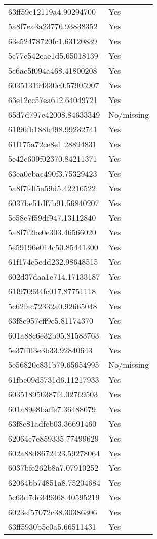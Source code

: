 \begin{tabular}{ll}
63ff59c12119a4.90294700 & Yes \\
5a8f7ea3a23776.93838352 & Yes \\
63e52478720fc1.63120839 & Yes \\
5c77c542eae1d5.65018139 & Yes \\
5c6ac5f094a468.41800208 & Yes \\
603513194330c0.57905907 & Yes \\
63e12cc57ea612.64049721 & Yes \\
65d7d797e42008.84633349 & No/missing \\
61f96fb188b498.99232741 & Yes \\
61f175a72ce8e1.28894831 & Yes \\
5e42c609f02370.84211371 & Yes \\
63ea0ebac490f3.75329423 & Yes \\
5a8f7fdf5a59d5.42216522 & Yes \\
6037be51df7b91.56840207 & Yes \\
5e58e7f59df947.13112840 & Yes \\
5a8f7f2be0e303.46566020 & Yes \\
5e59196e014c50.85441300 & Yes \\
61f174e5cdd232.98648515 & Yes \\
602d37daa1e714.17133187 & Yes \\
61f970934fc017.87751118 & Yes \\
5c62fac72332a0.92665048 & Yes \\
63f8c957cff9e5.81174370 & Yes \\
601a88c6e32b95.81583763 & Yes \\
5e37ffff3e3b33.92840643 & Yes \\
5e56820c831b79.65654995 & No/missing \\
61fbe09d5731d6.11217933 & Yes \\
603518950387f4.02769503 & Yes \\
601a89e8baffe7.36488679 & Yes \\
63f8c81adfcb03.36691460 & Yes \\
62064c7e859335.77499629 & Yes \\
602a88d8672423.59278064 & Yes \\
6037bfe262b8a7.07910252 & Yes \\
62064bb74851a8.75204684 & Yes \\
5c63d7dc349368.40595219 & Yes \\
6023ef57072c38.30386306 & Yes \\
63ff5930b5e0a5.66511431 & Yes \\

\end{tabular}
